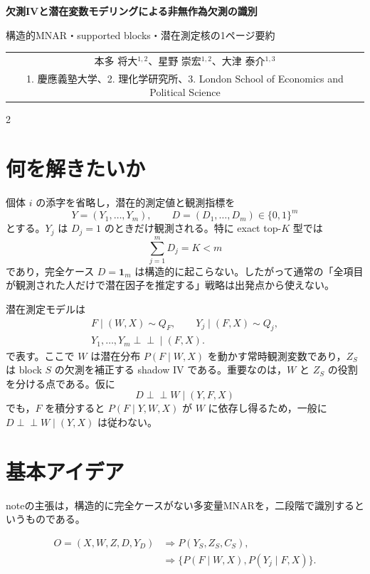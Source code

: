 \documentclass[a4paper,10pt]{article}
\newcommand{\indep}{\mathrel{\perp\!\!\!\perp}}
\newcommand{\papertitle}{欠測IVと潜在変数モデリングによる非無作為欠測の識別}
\newcommand{\subtitle}{構造的MNAR・supported blocks・潜在測定核の1ページ要約}
\newcommand{\authorblock}{%
  \begin{tabular}{c}
    本多 将大\(^{1,2}\)、星野 崇宏\(^{1,2}\)、大津 泰介\(^{1,3}\)\\[-0.1mm]
    {\scriptsize 1. 慶應義塾大学、2. 理化学研究所、3. London School of Economics and Political Science}
  \end{tabular}
}
\begin{document}
\vspace*{-9mm}
\begin{center}
  {\large\bfseries \papertitle\par}
  \vspace{0.2mm}
  {\small \subtitle\par}
  \vspace{0.5mm}
  {\footnotesize \authorblock}
\end{center}
\vspace{-3.5mm}

\footnotesize
\setlength{\baselineskip}{9.7pt}
\setlength{\abovedisplayskip}{1.2pt}
\setlength{\belowdisplayskip}{1.2pt}
\setlength{\abovedisplayshortskip}{0.8pt}
\setlength{\belowdisplayshortskip}{0.8pt}
\setlength{\jot}{0pt}
\begin{multicols}{2}

\section{何を解きたいか}
個体 \(i\) の添字を省略し，潜在的測定値と観測指標を
\[
  Y=(Y_1,\ldots,Y_m),\qquad
  D=(D_1,\ldots,D_m)\in\{0,1\}^m
\]
とする。\(Y_j\) は \(D_j=1\) のときだけ観測される。特に exact top-\(K\) 型では
\[
  \sum_{j=1}^m D_j=K<m
\]
であり，完全ケース \(D=\bm1_m\) は構造的に起こらない。したがって通常の「全項目が観測された人だけで潜在因子を推定する」戦略は出発点から使えない。

潜在測定モデルは
\[
\begin{gathered}
F\mid(W,X)\sim Q_F,\qquad
Y_j\mid(F,X)\sim Q_j,\\
Y_1,\ldots,Y_m\indep\mid(F,X).
\end{gathered}
\]
で表す。ここで \(W\) は潜在分布 \(P(F\mid W,X)\) を動かす常時観測変数であり，\(Z_S\) は block \(S\) の欠測を補正する shadow IV である。重要なのは，\(W\) と \(Z_S\) の役割を分ける点である。仮に
\[
  D\indep W\mid(Y,F,X)
\]
でも，\(F\) を積分すると \(P(F\mid Y,W,X)\) が \(W\) に依存し得るため，一般に \(D\indep W\mid(Y,X)\) は従わない。

\section{基本アイデア}
noteの主張は，構造的に完全ケースがない多変量MNARを，二段階で識別するというものである。

\[
\begin{aligned}
O=(X,W,Z,D,Y_D)&\Longrightarrow P(Y_S,Z_S,C_S),\\
&\Longrightarrow \{P(F\mid W,X),P(Y_j\mid F,X)\}.
\end{aligned}
\]


\end{multicols}
\end{document}
